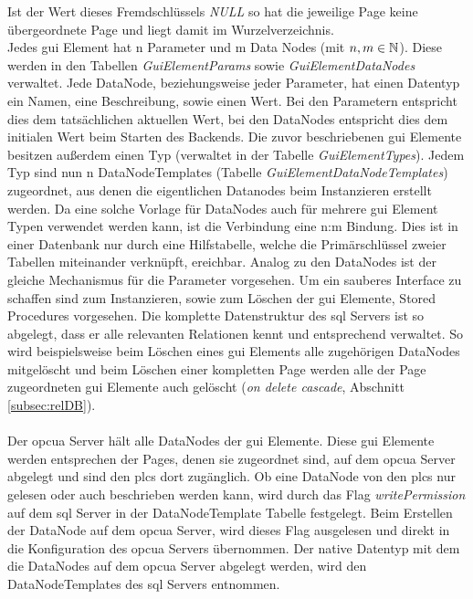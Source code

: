 Ist der Wert dieses Fremdschlüssels \emph{NULL} so hat die jeweilige Page keine übergeordnete Page und liegt damit im Wurzelverzeichnis.\\
Jedes \ac{gui} Element hat n Parameter und m Data Nodes (mit $ n, m \in \mathbb{N} $). 
Diese werden in den Tabellen \emph{GuiElementParams} sowie \emph{GuiElementDataNodes} verwaltet.
Jede DataNode, beziehungsweise jeder Parameter, hat einen Datentyp ein Namen, eine Beschreibung, sowie einen Wert. 
Bei den Parametern entspricht dies dem tatsächlichen aktuellen Wert, 
bei den DataNodes entspricht dies dem initialen Wert beim Starten des Backends.
Die zuvor beschriebenen \ac{gui} Elemente besitzen außerdem einen Typ (verwaltet in der Tabelle \emph{GuiElementTypes}).
Jedem Typ sind nun n DataNodeTemplates (Tabelle \emph{GuiElementDataNodeTemplates}) zugeordnet, 
aus denen die eigentlichen Datanodes beim Instanzieren erstellt werden. Da eine solche Vorlage für DataNodes auch für mehrere \ac{gui} Element Typen verwendet werden kann, ist die Verbindung eine n:m Bindung. 
Dies ist in einer Datenbank nur durch eine Hilfstabelle, 
welche die Primärschlüssel zweier Tabellen miteinander verknüpft, ereichbar. 
Analog zu den DataNodes ist der gleiche Mechanismus für die Parameter vorgesehen.
Um ein sauberes Interface zu schaffen sind zum Instanzieren, 
sowie zum Löschen der \ac{gui} Elemente, Stored Procedures vorgesehen.
Die komplette Datenstruktur des \ac{sql} Servers ist so abgelegt, 
dass er alle relevanten Relationen kennt und entsprechend verwaltet.
So wird beispielsweise beim Löschen eines \ac{gui} Elements alle zugehörigen DataNodes mitgelöscht und 
beim Löschen einer kompletten Page werden alle der Page zugeordneten \ac{gui} Elemente auch gelöscht (\emph{on delete cascade}, Abschnitt \ref{subsec:relDB}).\\ \\

Der \ac{opcua} Server hält alle DataNodes der \ac{gui} Elemente. 
Diese \ac{gui} Elemente werden entsprechen der Pages, denen sie zugeordnet sind, auf dem \ac{opcua} Server abgelegt und 
sind den \acp{plc} dort zugänglich.
Ob eine DataNode von den \acp{plc} nur gelesen oder auch beschrieben werden kann, 
wird durch das Flag \emph{writePermission} auf dem \ac{sql} Server in der DataNodeTemplate Tabelle festgelegt. 
Beim Erstellen der DataNode auf dem \ac{opcua} Server, wird dieses Flag ausgelesen und 
direkt in die Konfiguration des \ac{opcua} Servers übernommen.
Der native Datentyp mit dem die DataNodes auf dem \ac{opcua} Server abgelegt werden, wird den DataNodeTemplates des \ac{sql} Servers entnommen.

